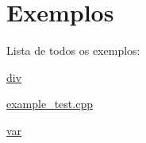 \section{Exemplos}
Lista de todos os exemplos\-:\begin{DoxyCompactItemize}
\item 
\hyperlink{div-example}{div}
\item 
\hyperlink{example_test_8cpp-example}{example\-\_\-test.\-cpp}
\item 
\hyperlink{var-example}{var}
\end{DoxyCompactItemize}
